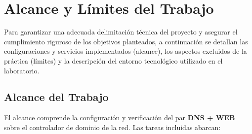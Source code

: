 
\section{Alcance y L\'imites del Trabajo}

Para garantizar una adecuada delimitaci\'on t\'ecnica del proyecto y asegurar
el cumplimiento riguroso de los objetivos planteados, a continuaci\'on se
detallan las configuraciones y servicios implementados (alcance), los
aspectos excluidos de la pr\'actica (l\'imites) y la descripci\'on del
entorno tecnol\'ogico utilizado en el laboratorio.

\subsection{Alcance del Trabajo}

El alcance comprende la configuraci\'on y verificaci\'on del par
\textbf{DNS + WEB} sobre el controlador de dominio de la red. Las tareas
incluidas abarcan:

